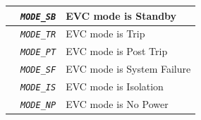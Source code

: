 \begin{itemize}
\begin{longtable}{|l|l|l|}
			\hline

			&	\begin{minipage}[t]{0.40\linewidth} \emph{\texttt{MODE\_SB}} \end{minipage}
			&	\begin{minipage}[t]{0.38\linewidth} EVC mode is Standby \end{minipage} \\

			\hline

			&	\begin{minipage}[t]{0.40\linewidth} \emph{\texttt{MODE\_TR}} \end{minipage}
			&	\begin{minipage}[t]{0.38\linewidth} EVC mode is Trip \end{minipage} \\

			\hline

			&	\begin{minipage}[t]{0.40\linewidth} \emph{\texttt{MODE\_PT}} \end{minipage}
			&	\begin{minipage}[t]{0.38\linewidth} EVC mode is Post Trip \end{minipage} \\

			\hline

			&	\begin{minipage}[t]{0.40\linewidth} \emph{\texttt{MODE\_SF}} \end{minipage}
			&	\begin{minipage}[t]{0.38\linewidth} EVC mode is System Failure \end{minipage} \\

			\hline

			&	\begin{minipage}[t]{0.40\linewidth} \emph{\texttt{MODE\_IS}} \end{minipage}
			&	\begin{minipage}[t]{0.38\linewidth} EVC mode is Isolation \end{minipage} \\

			\hline

			&	\begin{minipage}[t]{0.40\linewidth} \emph{\texttt{MODE\_NP}} \end{minipage}
			&	\begin{minipage}[t]{0.38\linewidth} EVC mode is No Power \end{minipage} \\


\end{longtable}
\end{itemize}
